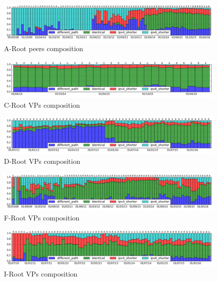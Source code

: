 \begin{appendices}
	\begin{figure}[!htb]
		\centering
		\includegraphics[width=6.0in]{img/peer_composition_a.png}
		\caption{A-Root peers composition}
		\label{fig:peer-comp-a}
	\end{figure}
	\begin{figure}[!htb]
		\centering
		\includegraphics[width=6.0in]{img/peer_composition_c.png}
		\caption{C-Root VPs composition}
		\label{fig:peer-comp-c}
	\end{figure}
	\begin{figure}[!htb]
		\centering
		\includegraphics[width=6.0in]{img/peer_composition_d.png}
		\caption{D-Root VPs composition}
		\label{fig:peer-comp-d}
	\end{figure}
	\begin{figure}[!htb]
		\centering
		\includegraphics[width=6.0in]{img/peer_composition_f.png}
		\caption{F-Root VPs composition}
		\label{fig:peer-comp-f}
	\end{figure}
	\begin{figure}[!htb]
		\centering
		\includegraphics[width=6.0in]{img/peer_composition_i.png}
		\caption{I-Root VPs composition}
		\label{fig:peer-comp-i}

\end{figure}
\end{appendices}
